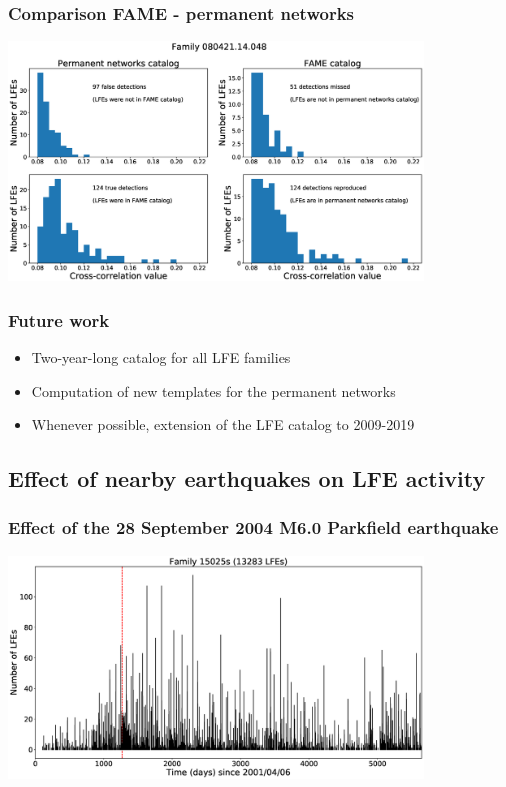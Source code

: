 \documentclass{beamer}
\begin{document}
	\begin{frame}
		\frametitle{Comparison FAME - permanent networks}
		\begin{center}
			\includegraphics[width=11cm, trim={0cm 0cm 0cm 0cm}, clip]{catalog_SC/08042114048_comparison.eps}
		\end{center}
	\end{frame}

	\begin{frame}
		\frametitle{Future work}
		\begin{itemize}
			\item Two-year-long catalog for all LFE families
			\item Computation of new templates for the permanent networks
			\item Whenever possible, extension of the LFE catalog to 2009-2019
		\end{itemize}
	\end{frame}


	\subsection{Effect of nearby earthquakes on LFE activity}

	\begin{frame}
		\frametitle{Effect of the 28 September 2004 M6.0 Parkfield earthquake}
		\begin{center}
			\includegraphics[width=11cm, trim={0cm 0cm 0cm 0cm}, clip]{LFE_catalogs/15025s_Parkfield.eps}
		\end{center}
	\end{frame}
\end{document}

